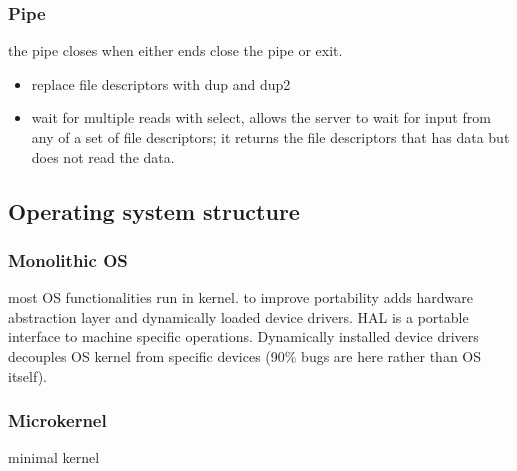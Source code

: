 \subsubsection*{Pipe}
the pipe closes when either ends close the pipe or exit.
\begin{itemize}
    \item replace file descriptors with dup and dup2
    \item wait for multiple reads with select, allows the server to wait for input from any of a set of file descriptors; it returns the file descriptors that has data but does not read the data.
\end{itemize}

\subsection{Operating system structure}
\subsubsection*{Monolithic OS}
most OS functionalities run in kernel. to improve portability adds hardware abstraction layer and dynamically loaded device drivers. HAL is a portable interface to machine specific operations. Dynamically installed device drivers decouples OS kernel from specific devices (90\% bugs are here rather than OS itself).
\subsubsection*{Microkernel}
minimal kernel